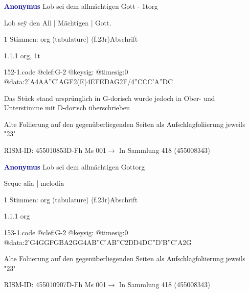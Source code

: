 \documentclass[twocolumn]{book}
\begin{document}
\par \vspace{7pt} \textcolor{darkblue}{\textbf{Anonymus  }}\hfillplus{\textbf{[152]}}\newline Lob sei dem allmächtigen Gott - 1t\newline org
\par \begin{itshape}[f.23r, at left:] Lob seÿ den All | Mächtigen | Gott.\end{itshape} 
\par \textcolor{darkblue}{}  1 Stimmen: org (tabulature)  (f.23r)\newline Abschrift
\par 1.1.1  org, 1t  
\begin{filecontents*}{152-1.code}
@clef:G-2
@keysig:
@timesig:0
@data:2'A4AA''C'AGF2(E)4EFEDAG2F/4''CCC'A''DC
\end{filecontents*}
\newline
%
\par Das Stück stand ursprünglich in G-dorisch wurde jedoch in Ober- und Unterstimme mit D-dorisch überschrieben
\par Alte Foliierung auf den gegenüberliegenden Seiten als Aufschlagfoliierung jeweils "23"
\par RISM-ID: 455010853\newline D-Fh  Ms 001\newline $\rightarrow$ In Sammlung 418 (455008343)
      
\par \vspace{7pt} \textcolor{darkblue}{\textbf{Anonymus  }}\hfillplus{\textbf{[153]}}\newline Lob sei dem allmächtigen Gott\newline org
\par \begin{itshape}[f.23r, at right:] Seque alia | melodia\end{itshape} 
\par \textcolor{darkblue}{}  1 Stimmen: org (tabulature)  (f.23r)\newline Abschrift
\par 1.1.1  org  
\begin{filecontents*}{153-1.code}
@clef:G-2
@keysig:
@timesig:0
@data:2'G4GGFGBA2GG4AB''C'AB''C2DD4DC''D'B''C'A2G
\end{filecontents*}
\newline
%
\par Alte Foliierung auf den gegenüberliegenden Seiten als Aufschlagfoliierung jeweils "23"
\par RISM-ID: 455010907\newline D-Fh  Ms 001\newline $\rightarrow$ In Sammlung 418 (455008343)
      
\end{document}
